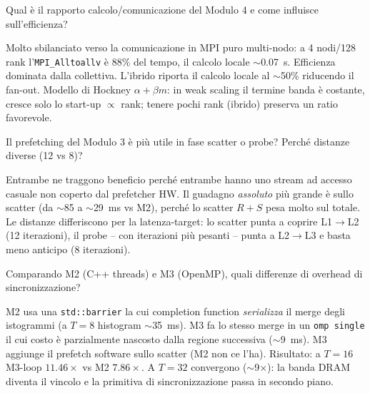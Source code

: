 \documentclass[11pt,a4paper]{article}
\theoremstyle{remark}
\newenvironment{esercizio}[1][]{%
  \begin{tcolorbox}[breakable,title={\textbf{Esercizio / Domanda d'esame}\ifx&#1&\else: #1\fi},
    colback=yellow!5!white, colframe=orange!75!black, fonttitle=\small\bfseries]%
}{%
  \end{tcolorbox}%
}
\newenvironment{risposta}{%
  \begin{tcolorbox}[breakable,title={\textbf{Risposta}},
    colback=green!5!white, colframe=green!50!black, fonttitle=\small\bfseries]%
}{%
  \end{tcolorbox}%
}
\begin{document}
\begin{esercizio}[2 -- Computation-to-communication ratio di M4]
Qual \`e il rapporto calcolo/comunicazione del Modulo 4 e come influisce sull'efficienza?
\end{esercizio}
\begin{risposta}
Molto sbilanciato verso la comunicazione in MPI puro multi-nodo: a 4 nodi/128 rank l'\texttt{MPI\_Alltoallv} \`e $88\%$ del tempo, il calcolo locale $\sim$0.07~s. Efficienza dominata dalla collettiva. L'ibrido riporta il calcolo locale al $\sim$50\% riducendo il fan-out. Modello di Hockney $\alpha+\beta m$: in weak scaling il termine banda \`e costante, cresce solo lo start-up $\propto$ rank; tenere pochi rank (ibrido) preserva un ratio favorevole.
\end{risposta}

\begin{esercizio}[3 -- Prefetch: scatter o probe?]
Il prefetching del Modulo 3 \`e pi\`u utile in fase scatter o probe? Perch\'e distanze diverse (12 vs 8)?
\end{esercizio}
\begin{risposta}
Entrambe ne traggono beneficio perch\'e entrambe hanno uno stream ad accesso casuale non coperto dal prefetcher HW. Il guadagno \emph{assoluto} pi\`u grande \`e sullo scatter (da $\sim$85 a $\sim$29~ms vs M2), perch\'e lo scatter $R{+}S$ pesa molto sul totale. Le distanze differiscono per la latenza-target: lo scatter punta a coprire L1$\to$L2 (12 iterazioni), il probe -- con iterazioni pi\`u pesanti -- punta a L2$\to$L3 e basta meno anticipo (8 iterazioni).
\end{risposta}

\begin{esercizio}[4 -- Overhead di sincronizzazione M2 vs M3]
Comparando M2 (C++ threads) e M3 (OpenMP), quali differenze di overhead di sincronizzazione?
\end{esercizio}
\begin{risposta}
M2 usa una \texttt{std::barrier} la cui completion function \emph{serializza} il merge degli istogrammi (a $T=8$ histogram $\sim$35~ms). M3 fa lo stesso merge in un \texttt{omp single} il cui costo \`e parzialmente nascosto dalla regione successiva ($\sim$9~ms). M3 aggiunge il prefetch software sullo scatter (M2 non ce l'ha). Risultato: a $T=16$ M3-loop $11.46\times$ vs M2 $7.86\times$. A $T=32$ convergono ($\sim$9$\times$): la banda DRAM diventa il vincolo e la primitiva di sincronizzazione passa in secondo piano.
\end{risposta}
\end{document}
